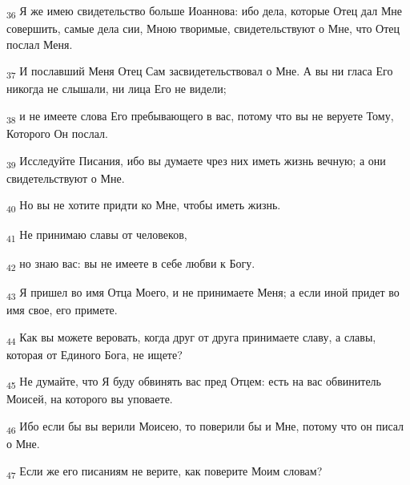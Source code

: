 \begin{tcolorbox}
\textsubscript{36} Я же имею свидетельство больше Иоаннова: ибо дела, которые Отец дал Мне совершить, самые дела сии, Мною творимые, свидетельствуют о Мне, что Отец послал Меня.
\end{tcolorbox}
\begin{tcolorbox}
\textsubscript{37} И пославший Меня Отец Сам засвидетельствовал о Мне. А вы ни гласа Его никогда не слышали, ни лица Его не видели;
\end{tcolorbox}
\begin{tcolorbox}
\textsubscript{38} и не имеете слова Его пребывающего в вас, потому что вы не веруете Тому, Которого Он послал.
\end{tcolorbox}
\begin{tcolorbox}
\textsubscript{39} Исследуйте Писания, ибо вы думаете чрез них иметь жизнь вечную; а они свидетельствуют о Мне.
\end{tcolorbox}
\begin{tcolorbox}
\textsubscript{40} Но вы не хотите придти ко Мне, чтобы иметь жизнь.
\end{tcolorbox}
\begin{tcolorbox}
\textsubscript{41} Не принимаю славы от человеков,
\end{tcolorbox}
\begin{tcolorbox}
\textsubscript{42} но знаю вас: вы не имеете в себе любви к Богу.
\end{tcolorbox}
\begin{tcolorbox}
\textsubscript{43} Я пришел во имя Отца Моего, и не принимаете Меня; а если иной придет во имя свое, его примете.
\end{tcolorbox}
\begin{tcolorbox}
\textsubscript{44} Как вы можете веровать, когда друг от друга принимаете славу, а славы, которая от Единого Бога, не ищете?
\end{tcolorbox}
\begin{tcolorbox}
\textsubscript{45} Не думайте, что Я буду обвинять вас пред Отцем: есть на вас обвинитель Моисей, на которого вы уповаете.
\end{tcolorbox}
\begin{tcolorbox}
\textsubscript{46} Ибо если бы вы верили Моисею, то поверили бы и Мне, потому что он писал о Мне.
\end{tcolorbox}
\begin{tcolorbox}
\textsubscript{47} Если же его писаниям не верите, как поверите Моим словам?
\end{tcolorbox}
